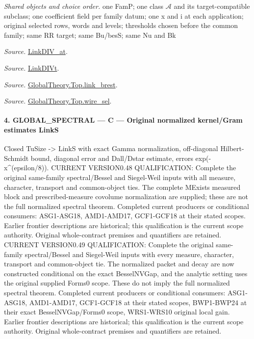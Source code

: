 \emph{Shared objects and choice order.} one FamP; one class $\mathcal A$ and its target-compatible subclass; one coefficient field per family datum; one x and i at each application; original selected rows, words and levels; thresholds chosen before the common family; same RR target; same Bu/besS; same Nu and Bk

\emph{Source.} \href{https://github.com/CocoSgt/riemann-hypothesis-lean/blob/7cbf7a0c32fca1badf05931879a37c3f8a2b03b4/src/Formalism/SharpRestriction/GlobalTheoremInputs.lean#L77-L90}{LinkDIV\_\allowbreak at}.

\emph{Source.} \href{https://github.com/CocoSgt/riemann-hypothesis-lean/blob/7cbf7a0c32fca1badf05931879a37c3f8a2b03b4/src/Formalism/SharpRestriction/GlobalTheoremInputs.lean#L94-L96}{LinkDIVt}.

\emph{Source.} \href{https://github.com/CocoSgt/riemann-hypothesis-lean/blob/7cbf7a0c32fca1badf05931879a37c3f8a2b03b4/src/Development/AbelianVarietyTheory/Proofs/GlobalInterpolation/LinkBrest.lean#L7-L25}{GlobalTheory.Top.link\_\allowbreak brest}.

\emph{Source.} \href{https://github.com/CocoSgt/riemann-hypothesis-lean/blob/7cbf7a0c32fca1badf05931879a37c3f8a2b03b4/src/Development/AbelianVarietyTheory/Proofs/GlobalInterpolation/WireSel.lean#L11-L41}{GlobalTheory.Top.wire\_\allowbreak sel}.



\paragraph{4. GLOBAL\_\allowbreak SPECTRAL — C — Original normalized kernel/Gram estimates LinkS}

Closed TuSize -> LinkS with exact Gamma normalization, off-diagonal Hilbert-Schmidt bound, diagonal error and Dall/Dstar estimate, errors exp(-x\textasciicircum{}(epsilon/8)). CURRENT VERSION0.48 QUALIFICATION: Complete the original same-family spectral/Bessel and Siegel-Weil inputs with all measure, character, transport and common-object ties. The complete MExists measured block and prescribed-measure covolume normalization are supplied; these are not the full normalized spectral theorem. Completed current producers or conditional consumers: ASG1-ASG18, AMD1-AMD17, GCF1-GCF18 at their stated scopes. Earlier frontier descriptions are historical; this qualification is the current scope authority. Original whole-contract premises and quantifiers are retained. CURRENT VERSION0.49 QUALIFICATION: Complete the original same-family spectral/Bessel and Siegel-Weil inputs with every measure, character, transport and common-object tie. The normalized packet and decay are now constructed conditional on the exact BesselNVGap, and the analytic setting uses the original supplied Forms0 scope. These do not imply the full normalized spectral theorem. Completed current producers or conditional consumers: ASG1-ASG18, AMD1-AMD17, GCF1-GCF18 at their stated scopes, BWP1-BWP24 at their exact BesselNVGap/Forms0 scope, WRS1-WRS10 original local gain. Earlier frontier descriptions are historical; this qualification is the current scope authority. Original whole-contract premises and quantifiers are retained.

